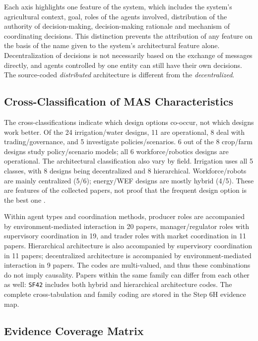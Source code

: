 \documentclass[11pt,a4paper]{article}
\begin{document}
Each axis highlights one feature of the system, which includes the system's agricultural context, goal, roles of the agents involved, distribution of the authority of decision-making, decision-making rationale and mechanism of coordinating decisions. This distinction prevents the attribution of any feature on the basis of the name given to the system's architectural feature alone. Decentralization of decisions is not necessarily based on the exchange of messages directly, and agents controlled by one entity can still have their own decisions. The source-coded \emph{distributed} architecture is different from the \emph{decentralized}.

\subsection{Cross-Classification of MAS Characteristics}

The cross-classifications indicate which design options co-occur, not which designs work better. Of the 24 irrigation/water designs, 11 are operational, 8 deal with trading/governance, and 5 investigate policies/scenarios. 6 out of the 8 crop/farm designs study policy/scenario models; all 6 workforce/robotics
designs are operational. The architectural classification also vary by field. Irrigation uses all 5 classes, with 8 designs being decentralized and 8 hierarchical. Workforce/robots are mainly centralized (5/6); energy/WEF designs are mostly hybrid (4/5). These are features of the collected papers, not proof that the frequent design option is the best one \parencite{harman_multi-agent_2022,shah_peer--peer_2024}.

Within agent types and coordination methods, producer roles are accompanied by environment-mediated interaction in 20 papers, manager/regulator roles with supervisory coordination in 19, and trader roles with market coordination in 11 papers. Hierarchical architecture is also accompanied by supervisory coordination in 11 papers; decentralized architecture is accompanied by environment-mediated interaction in 9 papers. The codes are multi-valued, and thus these combinations do not imply causality. Papers within the same family can differ from each other as well: \texttt{SF42} includes both hybrid and hierarchical architecture codes. The complete cross-tabulation and family coding are stored in the Step 6H evidence map.

\subsection{Evidence Coverage Matrix}
\end{document}
